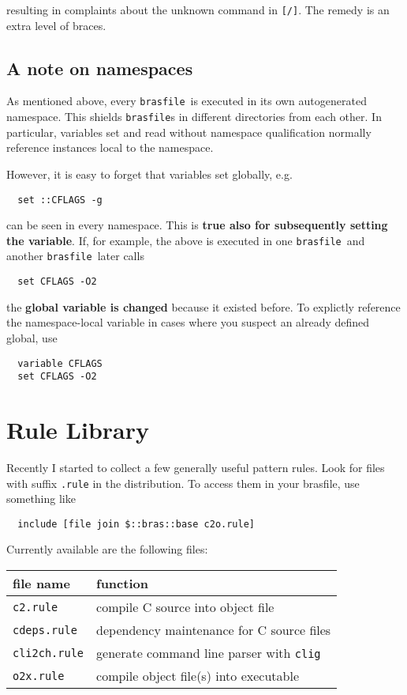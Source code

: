 \documentclass[11pt,bibtotoc,idxtotoc]{scrreprt}
\makeatletter
\newcommand{\brasfile}{\texttt{brasfile}}
\newcommand{\Indextt}[1]{\texttt{#1}\index{#1@\texttt{#1}}}
\makeatother
\begin{document}
resulting in complaints about the unknown command in
\texttt{[/]}. The remedy is an extra level of braces.


\subsection{A note on namespaces}
As mentioned above, every \brasfile\ is executed in its own
autogenerated namespace. This shields \brasfile{}s in different
directories from each other. In particular, variables set and
read without namespace qualification normally reference instances
local to the namespace. 

However, it is easy to forget that variables set globally,
e.g.
\begin{verbatim} 
  set ::CFLAGS -g
\end{verbatim}
can be seen in every namespace. This is \textbf{true also for
  subsequently setting the variable}. If, for example, the above is
executed in one \brasfile\ and another \brasfile\ later calls
\begin{verbatim} 
  set CFLAGS -O2
\end{verbatim}
the \textbf{global variable is changed} because it existed before. To
explictly reference the namespace-local variable in cases where you
suspect an already defined global, use
\begin{verbatim}
  variable CFLAGS
  set CFLAGS -O2
\end{verbatim}

\section{Rule Library}
Recently I started to collect a few generally useful pattern rules.
Look for files with suffix \Indextt{.rule} in the distribution. To
access them in your brasfile, use something like
\begin{verbatim}
  include [file join $::bras::base c2o.rule]
\end{verbatim}
Currently available are the following files:
\begin{center}
\begin{tabular}{l|l}
file name & function\\\hline
\texttt{c2.rule} & compile C source into object file\\
\texttt{cdeps.rule} & dependency maintenance for C source files\\
\texttt{cli2ch.rule} & generate command line parser with
  \Indextt{clig}\cite{Kir00}\\
\texttt{o2x.rule} & compile object file(s) into executable\\
\end{tabular}
\end{center}
\end{document}
